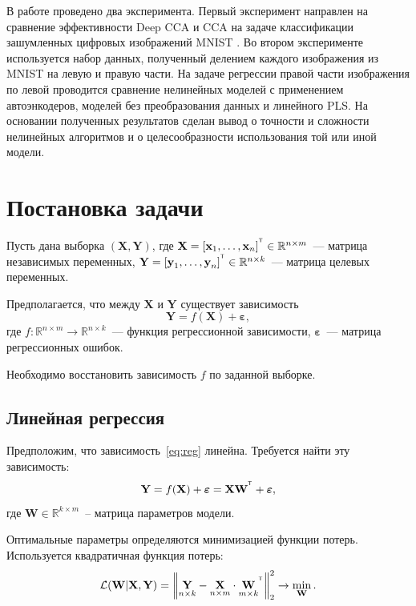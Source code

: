 \documentclass[12pt]{article}
\newcommand{\bY}{\mathbf{Y}}
\newcommand{\bX}{\mathbf{X}}
\newcommand{\bW}{\mathbf{W}}
\newcommand{\T}{^{\text{\tiny\sffamily\upshape\mdseries T}}}
\begin{document}
	В работе проведено два эксперимента. Первый эксперимент направлен на сравнение эффективности Deep CCA и CCA на задаче классификации зашумленных цифровых изображений MNIST \cite{MNIST}. Во втором эксперименте используется набор данных, полученный делением каждого изображения из MNIST на левую и правую части. На задаче регрессии правой части изображения по левой проводится сравнение нелинейных моделей с применением автоэнкодеров, моделей без преобразования данных и линейного PLS. На основании полученных результатов сделан вывод о точности и сложности нелинейных алгоритмов и о целесообразности использования той или иной модели.
	
	\section{Постановка задачи}
	
	Пусть дана выборка $(\bX, \bY)$, где $\textbf{X} = [\textbf{x}_1, \dots, \textbf{x}_{n}]^{\T} \in \mathbb{R}^{n \times m}$~--- матрица независимых переменных, $\textbf{Y} = [\textbf{y}_1, \dots, \textbf{y}_n]^{\T} \in \mathbb{R}^{n \times k}$~--- матрица целевых переменных.
	
	\noindent Предполагается, что между $\bX$ и $\bY$ существует зависимость
	\begin{equation}
		\bY = f(\bX) + \boldsymbol{\varepsilon},
		\label{eq:reg}
	\end{equation}
	где $f: \mathbb{R}^{n \times m} \to \mathbb{R}^{n \times k}$~--- функция регрессионной зависимости, $\boldsymbol{\varepsilon}$~--- матрица регрессионных ошибок.
	
	Необходимо восстановить зависимость $f$ по заданной выборке.
	
	\subsection{Линейная регрессия}
	Предположим, что зависимость~\eqref{eq:reg} линейна. Требуется найти эту зависимость:
	\begin{equation}
		\bY = f(\bX) + \boldsymbol{\varepsilon}=\bX \bW^{\T} + \boldsymbol{\varepsilon},
		\label{eq:model}
	\end{equation}
	\noindent где $\bW \in \mathbb{R}^{k \times m}$~-- матрица параметров модели.
	
	\noindent Оптимальные параметры определяются минимизацией функции потерь. Используется квадратичная функция потерь:
	\begin{equation}
		\mathcal{L}({\bW} | {\bX}, {\bY}) = {\left\| \underset{n \times k}{\bY}  - \underset{n \times m}{\bX} \cdot \underset{m \times k}{\bW}^{\T} \right\| }_2^2 \rightarrow\min_{\bW}.
		\label{eq:loss_function_2}
	\end{equation}
	
\end{document}
